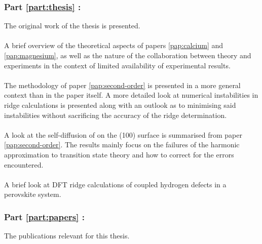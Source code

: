 \subsubsection{Part \ref{part:thesis} : }
The original work of the thesis is presented.

\paragraph{}
A brief overview of the theoretical aspects of papers \ref{pap:calcium} and \ref{pap:magnesium}, as well as the nature of the collaboration between theory and experiments in the context of limited availability of experimental results.

\paragraph{}
The methodology of paper \ref{pap:second-order} is presented in a more general context than in the paper itself.
A more detailed look at numerical instabilities in ridge calculations is presented along with an outlook as to minimising said instabilities without sacrificing the accuracy of the ridge determination.

\paragraph{}
A look at the self-diffusion of  on the (100) surface is summarised from paper \ref{pap:second-order}.
The results mainly focus on the failures of the harmonic approximation to transition state theory and how to correct for the errors encountered.

\paragraph{}
A brief look at DFT ridge calculations of coupled hydrogen defects in a  perovskite system.

\subsubsection{Part \ref{part:papers} : }
The publications relevant for this thesis.
